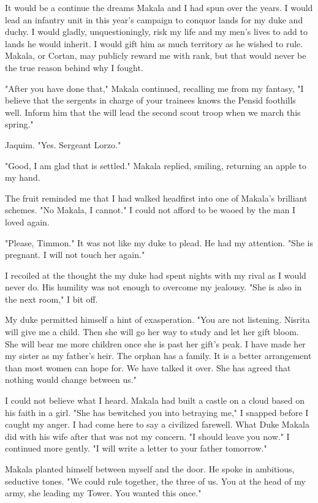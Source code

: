 \documentclass{article}
\begin{document}
It would be a continue the dreams Makala and I had spun over the years. I would lead an infantry unit in this year's campaign to conquor lands for my duke and duchy. I would gladly, unquestioningly, risk my life and my men's lives to add to lands he would inherit. I would gift him as much territory as he wished to rule. Makala, or Cortan, may publicly reward me with rank, but that would never be the true reason behind why I fought. 

"After you have done that," Makala continued, recalling me from my fantasy, "I believe that the sergents in charge of your trainees knows the Pensid foothills well. Inform him that the will lead the second scout troop when we march this spring."

Jaquim. "Yes. Sergeant Lorzo." 

"Good, I am glad that is settled." Makala replied, smiling, returning an apple to my hand. 

The fruit reminded me that I had walked headfirst into one of Makala's brilliant schemes. "No Makala, I cannot." I could not afford to be wooed by the man I loved again. 

"Please, Timmon." It was not like my duke to plead. He had my attention. "She is pregnant. I will not touch her again."

I recoiled at the thought the my duke had spent nights with my rival as I would never do. His humility was not enough to overcome my jealousy. "She is also in the next room," I bit off.

My duke permitted himself a hint of exasperation. "You are not listening. Nisrita will give me a child. Then she will go her way to study and let her gift bloom. She will bear me more children once she is past her gift's peak. I have made her my sister as my father's heir. The orphan has a family. It is a better arrangement than most women can hope for. We have talked it over. She has agreed that nothing would change between us." 

I could not believe what I heard. Makala had built a castle on a cloud based on his faith in a girl. "She has bewitched you into betraying me," I snapped before I caught my anger. I had come here to say a civilized farewell. What Duke Makala did with his wife after that was not my concern. "I should leave you now." I continued more gently. "I will write a letter to your father tomorrow."

Makala planted himself between myself and the door. He spoke in ambitious, seductive tones. "We could rule together, the three of us. You at the head of my army, she leading my Tower. You wanted this once." 
\end{document}
